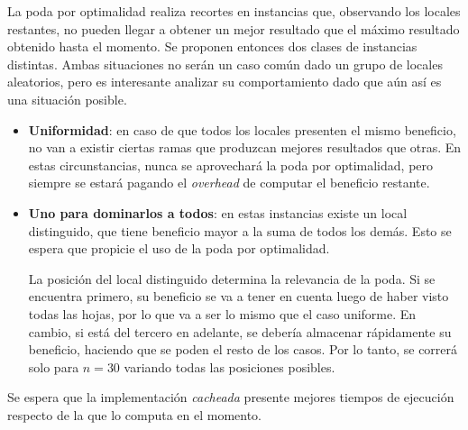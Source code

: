 La poda por optimalidad realiza recortes en instancias que, observando los locales restantes, no pueden llegar a obtener un mejor resultado que el máximo resultado obtenido hasta el momento. Se proponen entonces dos clases de instancias distintas. Ambas situaciones no serán un caso común dado un grupo de locales aleatorios, pero es interesante analizar su comportamiento dado que aún así es una situación posible.

\begin{itemize}
    \item \textbf{Uniformidad}: en caso de que todos los locales presenten el mismo beneficio, no van a existir ciertas ramas que produzcan mejores resultados que otras. En estas circunstancias, nunca se aprovechará la poda por optimalidad, pero siempre se estará pagando el \textit{overhead} de computar el beneficio restante.

    \item \textbf{Uno para dominarlos a todos}: en estas instancias existe un local distinguido, que tiene beneficio mayor a la suma de todos los demás. Esto se espera que propicie el uso de la poda por optimalidad.

    La posición del local distinguido determina la relevancia de la poda. Si se encuentra primero, su beneficio se va a tener en cuenta luego de haber visto todas las hojas, por lo que va a ser lo mismo que el caso uniforme. En cambio, si está del tercero en adelante, se debería almacenar rápidamente su beneficio, haciendo que se poden el resto de los casos. Por lo tanto, se correrá solo para $n=30$ variando todas las posiciones posibles.
\end{itemize}

Se espera que la implementación \textit{cacheada} presente mejores tiempos de ejecución respecto de la que lo computa en el momento.

